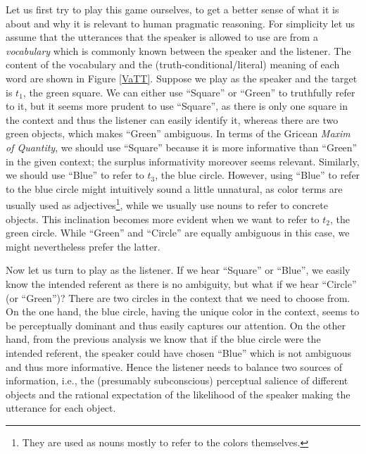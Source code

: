 Let us first try to play this game ourselves, to get a better sense of
what it is about and why it is relevant to human pragmatic
reasoning. For simplicity let us assume that the utterances that the
speaker is allowed to use are from a \emph{vocabulary} which is
commonly known between the speaker and the listener. The content of
the vocabulary and the (truth-conditional/literal) meaning of each
word are shown in Figure \ref{VaTT}. Suppose we play as the speaker
and the target is $t_1$, the green square. We can either use
``Square'' or ``Green'' to truthfully refer to it, but it seems more
prudent to use ``Square'', as there is only one square in the context
and thus the listener can easily identify it, whereas there are two
green objects, which makes ``Green'' ambiguous. In terms of the
Gricean \emph{Maxim of Quantity}, we should use ``Square'' because it
is more informative than ``Green'' in the given context; the surplus
informativity moreover seems relevant. Similarly, we should use
``Blue'' to refer to $t_3$, the blue circle. However, using ``Blue''
to refer to the blue circle might intuitively sound a little
unnatural, as color terms are usually used as adjectives\footnote{They
  are used as nouns mostly to refer to the colors themselves.}, while
we usually use nouns to refer to concrete objects. This inclination
becomes more evident when we want to refer to $t_2$, the green
circle. While ``Green'' and ``Circle'' are equally ambiguous in this
case, we might nevertheless prefer the latter.

Now let us turn to play as the listener. If we hear ``Square'' or
``Blue'', we easily know the intended referent as there is no
ambiguity, but what if we hear ``Circle'' (or ``Green'')? There are
two circles in the context that we need to choose from. On the one
hand, the blue circle, having the unique color in the context, seems
to be perceptually dominant and thus easily captures our attention. On
the other hand, from the previous analysis we know that if the blue
circle were the intended referent, the speaker could have chosen
``Blue'' which is not ambiguous and thus more informative. Hence the
listener needs to balance two sources of information, i.e., the
(presumably subconscious) perceptual salience of different objects and
the rational expectation of the likelihood of the speaker making the
utterance for each object. 


